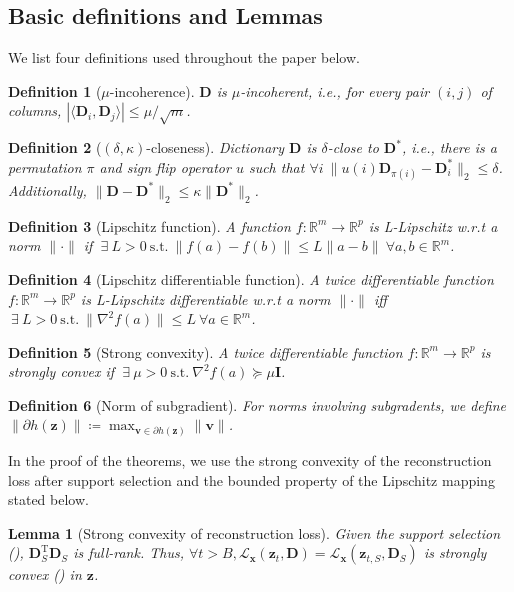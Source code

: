 \documentclass[10pt]{article} %
\newtheorem{lemma}{Lemma}[section]
\newtheorem{definition}{Definition}[section]
\newcommand{\R}{\mathbb{R}} %
\newcommand{\D}{{\bm D}}
\newcommand{\eye}{{\bm I}}
\newcommand{\x}{{\bm x}}
\newcommand{\z}{{\bm z}}
\newcommand{\Loss}{\mathcal{L}}
\begin{document}
\subsection{Basic definitions and Lemmas}
%
We list four definitions used throughout the paper below.
%
\begin{definition}[$\mu$-incoherence]\label{def:mu}
$\D$ is $\mu$-incoherent, i.e., for every pair $(i,j)$ of columns, $| \langle \D_i, \D_j \rangle | \leq \mu / \sqrt{m}$.
\end{definition}
%
%
\begin{definition}[$(\delta, \kappa)$-closeness]\label{def:closeness}
Dictionary $\D$ is $\delta$-close to $\D^{\ast}$, i.e., there is a permutation $\pi$ and sign flip operator $u$ such that $\forall i\ \| u(i) \D_{\pi(i)} - \D_i^{\ast} \|_2 \leq \delta$. Additionally, $\| \D - \D^{\ast} \|_2 \leq \kappa \| \D^{\ast} \|_2$.
\end{definition}
%
\begin{definition}[Lipschitz function]\label{def:lip}
A function $f \colon \R^m \to \R^p$ is L-Lipschitz w.r.t a norm $\| \cdot \|$ if $\ \exists\ L > 0\ \text{s.t.}\ \| f(a) - f(b) \| \leq L \| a - b \|\ \forall a, b \in \R^m$.
\end{definition}
%
\begin{definition}[Lipschitz differentiable function]\label{def:lipdiff}
A twice differentiable function $f \colon \R^m \to \R^p$ is L-Lipschitz differentiable w.r.t a norm $\| \cdot \|$ iff $\ \exists\ L > 0\ \text{s.t.}\ \| \nabla^2 f(a) \| \leq L\ \forall a \in \R^m$.
\end{definition}
%
\begin{definition}[Strong convexity]\label{def:strongconvex}
A twice differentiable function $f \colon \R^m \to \R^p$ is strongly convex if $\ \exists\ \mu > 0\ \text{s.t.}\ \nabla^2 f(a) \succeq \mu \eye$.
\end{definition}
%
\begin{definition}[Norm of subgradient]\label{def:normsubgrad}
For norms involving subgradents, we define $\| \partial h(\z) \| \coloneqq \max_{{\bm v} \in \partial h(\z)}  \| {\bm v} \|$.
\end{definition}
%
In the proof of the theorems, we use the strong convexity of the reconstruction loss after support selection and the bounded property of the Lipschitz mapping stated below.
%
\begin{lemma}[Strong convexity of reconstruction loss]\label{lemma:strongconvexloss}
Given the support selection (), $\D_{S}^{\text{T}} \D_S$ is full-rank. Thus, $\forall t > B, \Loss_{\x}(\z_{t}, \D) = \Loss_{\x}(\z_{t,S}, \D_S)$ is strongly convex () in $\z$.
\end{lemma}
\end{document}
